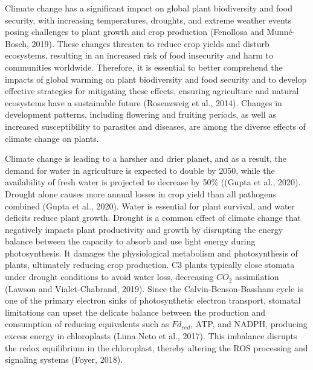 \documentclass[
  12pt,
  letterpaper,
  DIV=11,
  numbers=noendperiod]{scrartcl}
\begin{document}
Climate change has a significant impact on global plant biodiversity and
food security, with increasing temperatures, droughts, and extreme
weather events posing challenges to plant growth and crop production
(Fenollosa and Munné-Bosch, 2019). These changes threaten to reduce crop
yields and disturb ecosystems, resulting in an increased risk of food
insecurity and harm to communities worldwide. Therefore, it is essential
to better comprehend the impacts of global warming on plant biodiversity
and food security and to develop effective strategies for mitigating
these effects, ensuring agriculture and natural ecosystems have a
sustainable future (Rosenzweig et al., 2014). Changes in development
patterns, including flowering and fruiting periods, as well as increased
susceptibility to parasites and diseases, are among the diverse effects
of climate change on plants.

Climate change is leading to a harsher and drier planet, and as a
result, the demand for water in agriculture is expected to double by
2050, while the availability of fresh water is projected to decrease by
50\% ((Gupta et al., 2020). Drought alone causes more annual losses in
crop yield than all pathogens combined (Gupta et al., 2020). Water is
essential for plant survival, and water deficits reduce plant growth.
Drought is a common effect of climate change that negatively impacts
plant productivity and growth by disrupting the energy balance between
the capacity to absorb and use light energy during photosynthesis. It
damages the physiological metabolism and photosynthesis of plants,
ultimately reducing crop production. C3 plants typically close stomata
under drought conditions to avoid water loss, decreasing \(CO_2\)
assimilation (Lawson and Vialet-Chabrand, 2019). Since the
Calvin-Benson-Bassham cycle is one of the primary electron sinks of
photosynthetic electron transport, stomatal limitations can upset the
delicate balance between the production and consumption of reducing
equivalents such as \(Fd_{red}\), ATP, and NADPH, producing excess
energy in chloroplasts (Lima Neto et al., 2017). This imbalance disrupts
the redox equilibrium in the chloroplast, thereby altering the ROS
processing and signaling systems (Foyer, 2018).
\end{document}
